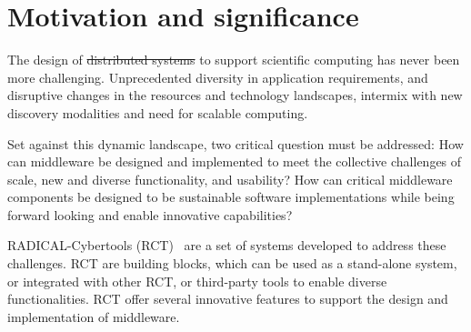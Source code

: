 \documentclass[preprint,12pt, a4paper]{elsarticle}
\begin{document}
\section{Motivation and significance}\label{sec:motivation}


The design of \st{distributed systems}  to support scientific 
computing has never been more challenging. Unprecedented diversity in 
application requirements, and disruptive changes in the resources and technology 
landscapes, intermix with new discovery modalities and need for scalable computing.

Set against this dynamic landscape, two critical question must be addressed:
How can middleware be designed and implemented to meet the collective
challenges of scale, new and diverse functionality, and usability? How can
critical middleware components be designed to be sustainable software
implementations while being forward looking and enable innovative
capabilities?

RADICAL-Cybertools (RCT)~\cite{github-rct} are a set of systems developed to address these
challenges.  RCT are building blocks, which can be used as a stand-alone
system, or integrated with other RCT, or third-party tools to enable diverse
functionalities. RCT offer several innovative features to support the design
and implementation of middleware.
\end{document}

